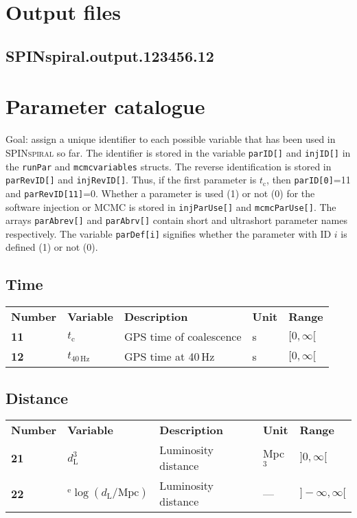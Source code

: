 \pagebreak
\section{Output files}

\subsection{SPINspiral.output.123456.12}





\pagebreak
\section{Parameter catalogue}
\label{sec:parameter_catalogue}
Goal: assign a unique identifier to each possible variable that has been used in \textsc{SPINspiral} so far.
The identifier is stored in the variable \texttt{parID[]} and \texttt{injID[]} in the \texttt{runPar} and 
\texttt{mcmcvariables} structs.  The reverse identification is stored in \texttt{parRevID[]} and 
\texttt{injRevID[]}.  Thus, if the first parameter is $t_\mathrm{c}$, then \texttt{parID[0]}=11 and
\texttt{parRevID[11]}=0.  Whether a parameter is used (1) or not (0) for the software injection or MCMC 
is stored in \texttt{injParUse[]} and \texttt{mcmcParUse[]}.  The arrays \texttt{parAbrev[]} and 
\texttt{parAbrv[]} contain short and ultrashort parameter names respectively. The variable \texttt{parDef[i]} 
signifies whether the parameter with ID $i$ is defined (1) or not (0).

\subsection{Time}
\begin{tabular}{lllll}
  \textbf{Number} & \textbf{Variable} & \textbf{Description} & \textbf{Unit} & \textbf{Range} \\
  \textbf{11} & $t_\mathrm{c}$        & GPS time of coalescence & s & $[0,\infty[$ \\
  \textbf{12} & $t_\mathrm{40\,Hz}$   & GPS time at 40\,Hz & s & $[0,\infty[$ \\
\end{tabular}

\subsection{Distance}
\begin{tabular}{lllll}
  \textbf{Number} & \textbf{Variable} & \textbf{Description} & \textbf{Unit} & \textbf{Range} \\
  \textbf{21} & $d_\mathrm{L}^3$ & Luminosity distance & Mpc$^3$ & $]0,\infty[$ \\
  \textbf{22} & $^\mathrm{e}\log(d_\mathrm{L}/\mathrm{Mpc})$ & Luminosity distance & --- & $]-\infty,\infty[$ \\
\end{tabular}

